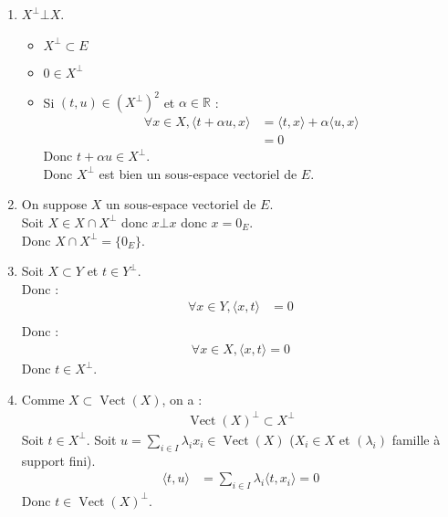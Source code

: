 \documentclass[../main.tex]{subfiles}
\begin{document}
\begin{enumerate}
    \item $X^\bot \bot X$. \\
    \begin{itemize}
        \item $X^\bot\subset E$
        \item $0\in X^\bot$
        \item Si $(t, u)\in (X^\bot)^2$ et $\alpha\in \mathbb{R}$ : 
        \begin{align*}
            \forall x\in X, \langle t + \alpha u, x\rangle &= \langle t, x\rangle + \alpha \langle u, x\rangle \\
            &= 0
        \end{align*}
        Donc $t + \alpha u\in X^\bot$. \\
        Donc $X^\bot$ est bien un sous-espace vectoriel de $E$. 
    \end{itemize}
    \item On suppose $X$ un sous-espace vectoriel de $E$. \\
    Soit $X\in X\cap X^\bot$ donc $x\bot x$ donc $x = 0_E$. \\
    Donc $X\cap X^\bot = \{0_E\}$. 
    \item Soit $X\subset Y$ et $t\in Y^\bot$. \\
    Donc : 
    \begin{align*}
        \forall x\in Y, \langle x, t\rangle &= 0 \\
    \end{align*}
    Donc : 
    \begin{align*}
        \forall x\in X, \langle x, t\rangle = 0
    \end{align*}
    Donc $t\in X^\bot$. 
    \item Comme $X\subset \operatorname{Vect}(X)$, on a : 
    \begin{align*}
        \operatorname{Vect}(X)^\bot \subset X^\bot
    \end{align*}
    Soit $t\in X^\bot$. Soit $u = \sum\limits_{i\in I} \lambda_i x_i\in \operatorname{Vect}(X)$ ($X_i\in X$ et $(\lambda_i)$ famille à support fini). 
    \begin{align*}
        \langle t, u \rangle &= \sum_{i\in I} \lambda_i \langle t, x_i\rangle = 0
    \end{align*}
    Donc $t\in \operatorname{Vect}(X)^\bot$.
\end{enumerate}

\end{document}
